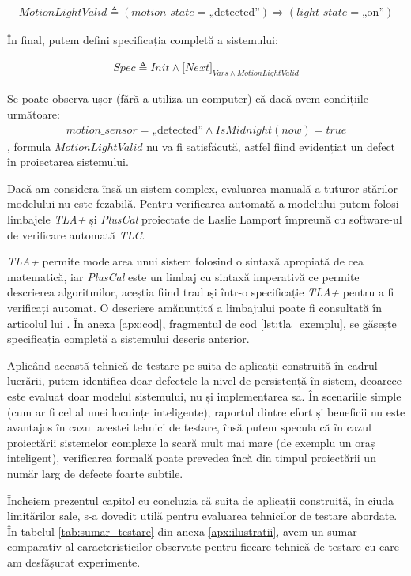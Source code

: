 \begin{align*}
    MotionLightValid \triangleq (motion\_state = \text{„detected”}) \Rightarrow (light\_state = \text{„on”})
\end{align*}

În final, putem defini specificația completă a sistemului:

\begin{align*}
    Spec \triangleq Init \wedge {[}Next{]}_{Vars \wedge MotionLightValid}
\end{align*}

Se poate observa ușor (fără a utiliza un computer) că dacă avem condițiile următoare:
\begin{gather*}
    motion\_sensor = \text{„detected”} \wedge IsMidnight(now) = true
\end{gather*}
, formula $MotionLightValid$ nu va fi satisfăcută, astfel fiind evidențiat un defect în proiectarea sistemului.

Dacă am considera însă un sistem complex, evaluarea manuală a tuturor stărilor modelului nu este fezabilă. Pentru verificarea automată a modelului putem folosi limbajele \textit{TLA+} și \textit{PlusCal} proiectate de Laslie Lamport împreună cu software-ul de verificare automată \textit{TLC}. 

\textit{TLA+} permite modelarea unui sistem folosind o sintaxă apropiată de cea matematică, iar \textit{PlusCal} este un limbaj cu sintaxă imperativă ce permite descrierea algoritmilor, aceștia fiind traduși într-o specificație \textit{TLA+} pentru a fi verificați automat. O descriere amănunțită a limbajului poate fi consultată în articolul lui . În anexa \ref{apx:cod}, fragmentul de cod \ref{lst:tla_exemplu}, se găsește specificația completă a sistemului descris anterior.

Aplicând această tehnică de testare pe suita de aplicații construită în cadrul lucrării, putem identifica doar defectele la nivel de persistență în sistem, deoarece este evaluat doar modelul sistemului, nu și implementarea sa. În scenariile simple (cum ar fi cel al unei locuințe inteligente), raportul dintre efort și beneficii nu este avantajos în cazul acestei tehnici de testare, însă putem specula că în cazul proiectării sistemelor complexe la scară mult mai mare (de exemplu un oraș inteligent), verificarea formală poate prevedea încă din timpul proiectării un număr larg de defecte foarte subtile.

Încheiem prezentul capitol cu concluzia că suita de aplicații construită, în ciuda limitărilor sale, s-a dovedit utilă pentru evaluarea tehnicilor de testare abordate. În tabelul \ref{tab:sumar_testare} din anexa \ref{apx:ilustratii}, avem un sumar comparativ al caracteristicilor observate pentru fiecare tehnică de testare cu care am desfășurat experimente. 